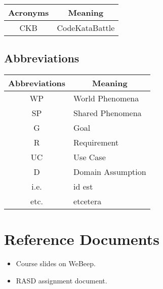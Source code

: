 \begin{table}[H]
    \centering
    \begin{tabular}{|c|l|}
    \hline
    \rowcolor[HTML]{B8C8D5} 
    \textbf{Acronyms} & \multicolumn{1}{c|}{\cellcolor[HTML]{B8C8D5}\textbf{Meaning}} \\ \hline
    CKB & CodeKataBattle  \\ \hline
    \end{tabular}
\end{table}

\subsection{Abbreviations}

\begin{table}[H]
    \centering
    \begin{tabular}{|c|l|}
    \hline
    \rowcolor[HTML]{B8C8D5} 
    \textbf{Abbreviations} & \multicolumn{1}{c|}{\cellcolor[HTML]{B8C8D5}\textbf{Meaning}} \\ \hline
    WP & World Phenomena  \\ \hline
    SP & Shared Phenomena \\ \hline
    G  & Goal             \\ \hline
    R  & Requirement             \\ \hline
    UC  & Use Case             \\ \hline
    D  & Domain Assumption             \\ \hline
    i.e. & id est \\ \hline
    etc. & etcetera \\ \hline
    \end{tabular}
\end{table}


\section{Reference Documents}
\begin{itemize}
    \item Course slides on WeBeep. 
    \item RASD assignment document.
\end{itemize}

\clearpage
